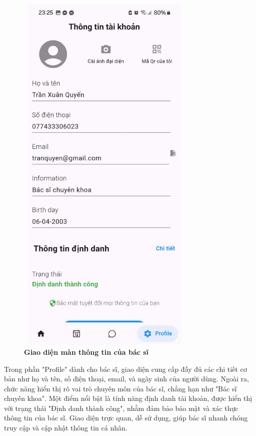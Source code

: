 \begin{figure}[H]
	\centering
	\includegraphics[width=8.5cm,height=18cm]{Images/AppUI/infoDoctor.jpg}
	\caption[Giao diện màn thông tin của bác sĩ]{\bfseries \fontsize{12pt}{0pt}\selectfont Giao diện màn thông tin của bác sĩ}
	\label{infoDoctor}
\end{figure}

Trong phần "Profile" dành cho bác sĩ, giao diện cung cấp đầy đủ các chi tiết cơ bản như họ và tên, số điện thoại, email, và ngày sinh của người dùng. Ngoài ra, chức năng hiển thị rõ vai trò chuyên môn của bác sĩ, chẳng hạn như "Bác sĩ chuyên khoa". Một điểm nổi bật là tính năng định danh tài khoản, được hiển thị với trạng thái "Định danh thành công", nhằm đảm bảo bảo mật và xác thực thông tin của bác sĩ. Giao diện trực quan, dễ sử dụng, giúp bác sĩ nhanh chóng truy cập và cập nhật thông tin cá nhân.


